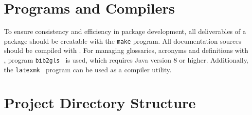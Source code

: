 \documentclass{xdpdoc}
\begin{document}
\begin{multicols}{2}
        \section{Programs and Compilers}
        To ensure consistency and efficiency in package development,
        all deliverables of a package should be creatable with the \texttt{make} program.
        All documentation sources should be compiled with \LuaLaTeX.
        For managing glossaries, acronyms and definitions with \BibTeX, program \texttt{bib2gls}~\cite{bib2gls} is used,
        which requires Java version 8 or higher.
        Additionally, the \texttt{latexmk}~\cite{latexmk} program can be used as a compiler utility.


        \section{Project Directory Structure}\label{sec:pds}


\end{multicols}
\end{document}
